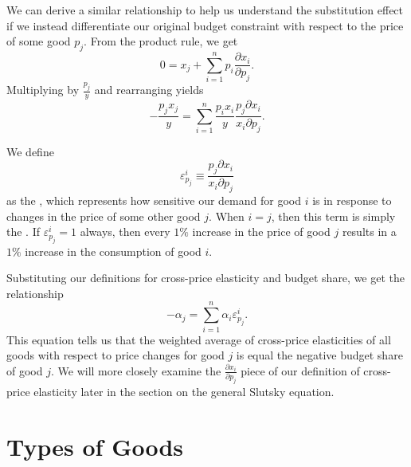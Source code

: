 We can derive a similar relationship to help us understand the substitution effect if we instead differentiate our original budget constraint with respect to the price of some good $p_j$. From the product rule, we get
$$
0=x_{j}+\sum_{i=1}^{n} p_{i} \frac{\partial x_{i}}{\partial p_{j}}.
$$
Multiplying by $\frac{p_j}{y}$ and rearranging yields 
$$
-\frac{p_{j} x_{j}}{y}=\sum_{i=1}^{n} \frac{p_{i} x_{i}}{y} \frac{p_{j} \partial x_{i}}{x_{i} \partial p_{j}}.
$$

We define 
$$\varepsilon_{p_j}^i \equiv \frac{p_j \partial x_{i}}{x_{i} \partial p_j}$$
as the , which represents how sensitive our demand for good $i$ is in response to changes in the price of some other good $j$. When $i=j$, then this term is simply the . If $\varepsilon_{p_j}^i = 1$ always, then every $1\%$ increase in the price of good $j$ results in a $1\%$ increase in the consumption of good $i$.

Substituting our definitions for cross-price elasticity and budget share, we get the relationship
$$
-\alpha_{j}=\sum_{i=1}^{n} \alpha_{i} \varepsilon_{p_{j}}^{i}.
$$
This equation tells us that the weighted average of cross-price elasticities of all goods with respect to price changes for good $j$ is equal the negative budget share of good $j$. We will more closely examine the $\frac{\partial x_{i}}{\partial p_j}$ piece of our definition of cross-price elasticity later in the section on the general Slutsky equation.

\section{Types of Goods}

